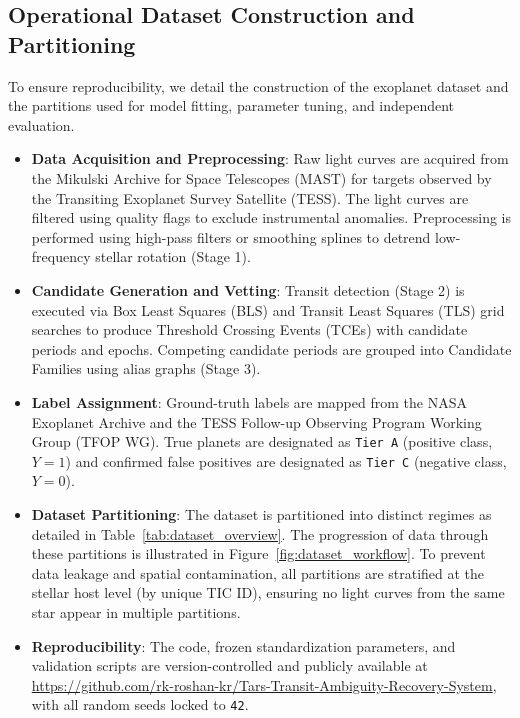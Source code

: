 \subsection{Operational Dataset Construction and Partitioning} \label{sec:method_dataset_overview}

To ensure reproducibility, we detail the construction of the exoplanet dataset and the partitions used for model fitting, parameter tuning, and independent evaluation. 

\begin{itemize}
\item \textbf{Data Acquisition and Preprocessing}: Raw light curves are acquired from the Mikulski Archive for Space Telescopes (MAST) for targets observed by the Transiting Exoplanet Survey Satellite (TESS). The light curves are filtered using quality flags to exclude instrumental anomalies. Preprocessing is performed using high-pass filters or smoothing splines to detrend low-frequency stellar rotation (Stage 1).
\item \textbf{Candidate Generation and Vetting}: Transit detection (Stage 2) is executed via Box Least Squares (BLS) and Transit Least Squares (TLS) grid searches to produce Threshold Crossing Events (TCEs) with candidate periods and epochs. Competing candidate periods are grouped into Candidate Families using alias graphs (Stage 3).
\item \textbf{Label Assignment}: Ground-truth labels are mapped from the NASA Exoplanet Archive and the TESS Follow-up Observing Program Working Group (TFOP WG). True planets are designated as \texttt{Tier A} (positive class, $Y=1$) and confirmed false positives are designated as \texttt{Tier C} (negative class, $Y=0$).
\item \textbf{Dataset Partitioning}: The dataset is partitioned into distinct regimes as detailed in Table~\ref{tab:dataset_overview}. The progression of data through these partitions is illustrated in Figure~\ref{fig:dataset_workflow}. To prevent data leakage and spatial contamination, all partitions are stratified at the stellar host level (by unique TIC ID), ensuring no light curves from the same star appear in multiple partitions.
\item \textbf{Reproducibility}: The code, frozen standardization parameters, and validation scripts are version-controlled and publicly available at \url{https://github.com/rk-roshan-kr/Tars-Transit-Ambiguity-Recovery-System}, with all random seeds locked to \texttt{42}.
\end{itemize}


